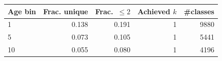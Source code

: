 \begin{tabular}{lrrrr}
\toprule
Age bin & Frac. unique & Frac.\ $\le2$ & Achieved $k$ & \#classes \\
\midrule
1 & 0.138 & 0.191 & 1 & 9880 \\
5 & 0.073 & 0.105 & 1 & 5441 \\
10 & 0.055 & 0.080 & 1 & 4196 \\
\bottomrule
\end{tabular}
